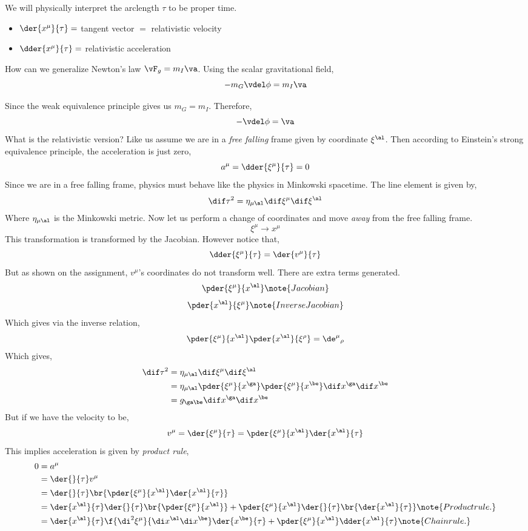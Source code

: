 \documentclass{article}
\begin{document}
We will physically interpret the arclength $\tau$ to be proper time.
\begin{itemize}
    \item $\der{x^\mu}{\tau} = $ tangent vector $=$ relativistic velocity
    \item $\dder{x^\mu}{\tau} = $ relativistic acceleration
\end{itemize}

How can we generalize Newton's law $\vF_g = m_I \va$. Using the scalar gravitational field,
\[ - m_G \vdel \phi = m_I \va \]

Since the weak equivalence principle gives us $m_G = m_I$. Therefore,
\[ - \vdel \phi = \va \]
What is the relativistic version? Like us assume we are in a \textit{free falling} frame given by coordinate $\xi^\al$. Then according to Einstein's strong equivalence principle, the acceleration is just zero,
\[ a^\mu = \dder{\xi^\mu}{\tau} = 0 \]
Since we are in a free falling frame, physics must behave like the physics in Minkowski spacetime. The line element is given by,
\[ \dif \tau ^2 = \eta_{\mu\al} \dif \xi^\mu \dif \xi^\al \]
Where $\eta_{\mu\al}$ is the Minkowski metric. Now let us perform a change of coordinates and move \textit{away} from the free falling frame.
\[ \xi^\mu \to x^\mu \]
This transformation is transformed by the Jacobian. However notice that,
\[ \dder{\xi^\mu}{\tau} = \der{v^\mu}{\tau} \]
But as shown on the assignment, $v^\mu$'s coordinates do not transform well. There are extra terms generated.
\[ \pder{\xi^\mu}{x^\al} \note{Jacobian} \]
\[ \pder{x^\al}{\xi^\mu} \note{Inverse Jacobian} \]
Which gives via the inverse relation,
\[ \pder{\xi^\mu}{x^\al}\pder{x^\al}{\xi^\rho} = {\de^\mu}_\rho \]
Which gives,
\begin{align*}
    \dif \tau^2 &= \eta_{\mu\al} \dif \xi^\mu \dif \xi^\al \\
    &= \eta_{\mu\al} \pder{\xi^\mu}{x^\ga}\pder{\xi^\mu}{x^\be}\dif x^\ga \dif x^\be \\
    &= g_{\ga\be}\dif x^\ga \dif x^\be
\end{align*}
But if we have the velocity to be,
\[ v^\mu = \der{\xi^\mu}{\tau} = \pder{\xi^\mu}{x^\al} \der{x^\al}{\tau} \]
This implies acceleration is given by \textit{product rule},
\begin{align*}
0 &= a^\mu  \\
&= \der{}{\tau} v^\mu \\
&= \der{}{\tau} \br{\pder{\xi^\mu}{x^\al} \der{x^\al}{\tau}} \\
&= \der{x^\al}{\tau}\der{}{\tau} \br{\pder{\xi^\mu}{x^\al} } + \pder{\xi^\mu}{x^\al}\der{}{\tau} \br{ \der{x^\al}{\tau}} \note{Product rule.}\\
&= \der{x^\al}{\tau} \f{\di^2\xi^\mu}{\di x^\al\di x^\be}\der{x^\be}{\tau} + \pder{\xi^\mu}{x^\al}\dder{x^\al}{\tau} \note{Chain rule.}\\
\end{align*}
\end{document}
